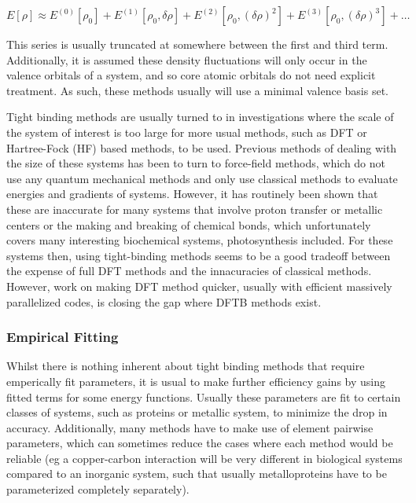 \begin{equation}
E\left[\rho\right] \approx E^{\left(0\right)}\left[\rho_0\right] + E^{\left(1\right)}\left[\rho_0, \delta\rho\right] + E^{\left(2\right)}\left[\rho_0, \left(\delta\rho\right)^2\right] + E^{\left(3\right)}\left[\rho_0, \left(\delta\rho\right)^3\right] + \dots
\end{equation}

This series is usually truncated at somewhere between the first and third term\cite{Gaus2011}. 
Additionally, it is assumed these density fluctuations will only occur in the valence 
orbitals of a system, and so core atomic orbitals do not need explicit treatment. 
As such, these methods usually will use a minimal valence basis set\cite{Bannwarth2020}.

Tight binding methods are usually turned to in investigations where the scale of 
the system of interest is too large for more usual methods, such as DFT or Hartree-Fock 
(HF) based methods, to be used. Previous methods of dealing with the size of these 
systems has been to turn to force-field methods, which do not use any quantum mechanical 
methods and only use classical methods to evaluate energies and gradients of systems. 
However, it has routinely been shown that these are inaccurate for many systems 
that involve proton transfer or metallic centers or the making and breaking of chemical 
bonds\cite{Salomon-Ferrer2013}, which unfortunately covers many interesting biochemical 
systems, photosynthesis included. For these systems then, using tight-binding methods 
seems to be a good tradeoff between the expense of full DFT methods and the innacuracies 
of classical methods. However, work on making DFT method quicker, usually with efficient 
massively parallelized codes, is closing the gap where DFTB methods exist\cite{Manathunga2020}.

\subsubsection{Empirical Fitting}

Whilst there is nothing inherent about tight binding methods that require emperically 
fit parameters, it is usual to make further efficiency gains by using fitted terms 
for some energy functions. Usually these parameters are fit to certain classes of 
systems, such as proteins or metallic system, to minimize the drop in accuracy. 
Additionally, many methods have to make use of element pairwise parameters\cite{Bannwarth2020}, 
which can sometimes reduce the cases where each method would be reliable (eg a copper-carbon 
interaction will be very different in biological systems compared to an inorganic system, 
such that usually metalloproteins have to be parameterized completely separately).

